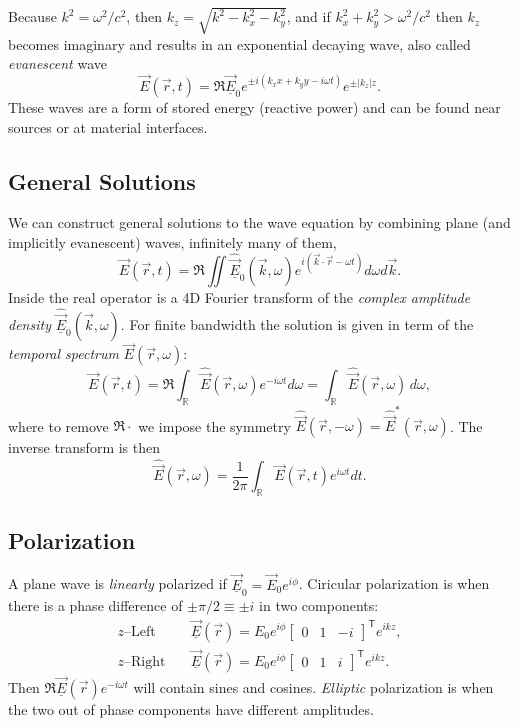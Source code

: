 \documentclass[margin=tiny]{hsrzf}
\newcommand{\cvec}[1]{\underline{\vec{#1}}}
\begin{document}
Because $k^2 = \omega^2 / c^2$, then $k_z = \sqrt{k^2 - k_x^2 - k_y^2}$, and
if $k_x^2 + k_y^2 > \omega^2 / c^2$ then $k_z$ becomes imaginary and results
in an exponential decaying wave, also called \emph{evanescent} wave
\[
  \vec{E}(\vec{r}, t) = \Re{\cvec{E}_0 e^{\pm i(k_x x + k_y y - i\omega t)}}
    e^{\pm|k_z| z}.
\]
These waves are a form of stored energy (reactive power) and can be found near
sources or at material interfaces.

\subsection{General Solutions}

We can construct general solutions to the wave equation by combining plane
(and implicitly evanescent) waves, infinitely many of them,
\[
  \vec{E}(\vec{r}, t) = \Re{\iint \hat{\cvec{E}}_0(\vec{k}, \omega)
    e^{i(\vec{k}\cdot \vec{r} - \omega t)} d\omega d\vec{k}}.
\]
Inside the real operator is a 4D Fourier transform of the \emph{complex
amplitude density} $\hat{\cvec{E}}_0(\vec{k}, \omega)$. For finite bandwidth
the solution is given in term of the \emph{temporal spectrum}
$\vec{E}(\vec{r}, \omega)$:
\[
  \vec{E}(\vec{r}, t) = \Re{
    \int_\mathbb{R} \hat{\vec{E}}(\vec{r}, \omega) e^{-i\omega t} d\omega
  } = \int_\mathbb{R} \hat{\vec{E}}(\vec{r}, \omega) \, d\omega,
\]
where to remove $\Re{\cdot}$ we impose the symmetry $\hat{\vec{E}}(\vec{r},
-\omega) = \hat{\vec{E}}^*(\vec{r}, \omega)$. The inverse transform is then
\[
  \hat{\vec{E}}(\vec{r}, \omega) = \frac{1}{2\pi} \int_\mathbb{R}
  \vec{E}(\vec{r}, t) e^{i\omega t} dt.
\]

\subsection{Polarization}

A plane wave is \emph{linearly} polarized if $\cvec{E}_0 = \vec{E}_0
e^{i\phi}$. Ciricular polarization is when there is a phase difference of $\pm
\pi / 2 \equiv \pm i$ in two components:
\begin{align*}
  z \text{--Left}\quad
    & \cvec{E}(\vec{r}) = E_0 e^{i\phi} \begin{bmatrix}
      0 & 1 & -i
    \end{bmatrix}^\mathsf{T} e^{ikz}, \\
  z \text{--Right}\quad
    & \cvec{E}(\vec{r}) = E_0 e^{i\phi} \begin{bmatrix}
      0 & 1 & i
    \end{bmatrix}^\mathsf{T} e^{ikz}.
\end{align*}
Then $\Re{\cvec{E}(\vec{r})e^{-i\omega t}}$ will contain sines and cosines.
\emph{Elliptic} polarization is when the two out of phase components have
different amplitudes.
\end{document}
